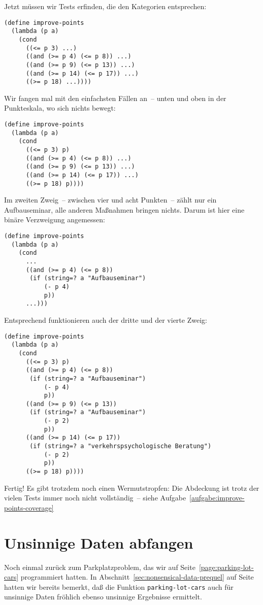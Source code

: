 %
Jetzt müssen wir Tests erfinden, die den Kategorien entsprechen:
%
\begin{verbatim}
(define improve-points
  (lambda (p a)
    (cond
      ((<= p 3) ...)
      ((and (>= p 4) (<= p 8)) ...)
      ((and (>= p 9) (<= p 13)) ...)
      ((and (>= p 14) (<= p 17)) ...)
      ((>= p 18) ...))))
\end{verbatim}
%
Wir fangen mal mit den einfachsten Fällen an~-- unten und oben in der
Punkteskala, wo sich nichts bewegt:
%
\begin{verbatim}
(define improve-points
  (lambda (p a)
    (cond
      ((<= p 3) p)
      ((and (>= p 4) (<= p 8)) ...)
      ((and (>= p 9) (<= p 13)) ...)
      ((and (>= p 14) (<= p 17)) ...)
      ((>= p 18) p))))
\end{verbatim}
%
Im zweiten Zweig~-- zwischen vier und acht Punkten~-- zählt nur ein
Aufbauseminar, alle anderen Maßnahmen bringen nichts.  Darum ist hier
eine binäre Verzweigung angemessen:
%
\begin{verbatim}
(define improve-points
  (lambda (p a)
    (cond
      ...
      ((and (>= p 4) (<= p 8))
       (if (string=? a "Aufbauseminar")
           (- p 4)
           p))
      ...)))
\end{verbatim}
%
Entsprechend funktionieren auch der dritte und der vierte Zweig:
%
\begin{verbatim}
(define improve-points
  (lambda (p a)
    (cond
      ((<= p 3) p)
      ((and (>= p 4) (<= p 8))
       (if (string=? a "Aufbauseminar")
           (- p 4)
           p))
      ((and (>= p 9) (<= p 13))
       (if (string=? a "Aufbauseminar")
           (- p 2)
           p))
      ((and (>= p 14) (<= p 17))
       (if (string=? a "verkehrspsychologische Beratung")
           (- p 2)
           p))
      ((>= p 18) p))))
\end{verbatim}
%
Fertig!  Es gibt trotzdem noch einen Wermutstropfen: Die Abdeckung ist
trotz der vielen Tests immer noch nicht vollständig~-- siehe
Aufgabe~\ref{aufgabe:improve-points-coverage}

\section{Unsinnige Daten abfangen}
\label{sec:nonsensical-data}

Noch einmal zurück zum Parkplatzproblem, das wir auf
Seite~\ref{page:parking-lot-cars} programmiert hatten.  In
Abschnitt~\ref{sec:nonsensical-data-prequel} auf
Seite~\pageref{sec:nonsensical-data-prequel} hatten wir bereits
bemerkt, daß die Funktion
\texttt{parking-lot-cars}
auch für unsinnige Daten fröhlich ebenso unsinnige Ergebnisse
ermittelt.

